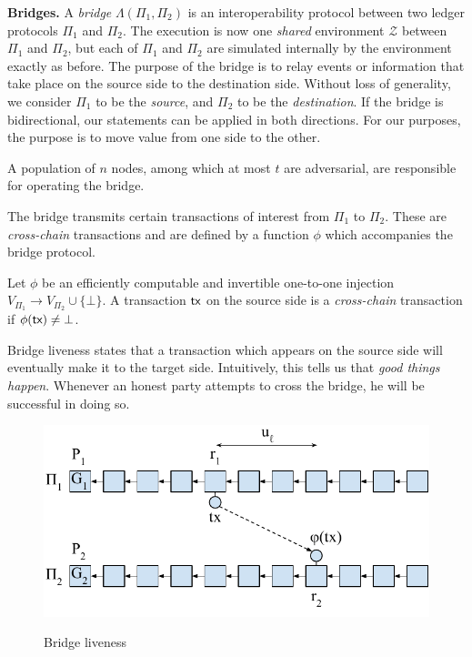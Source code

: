 \noindent
\textbf{Bridges.}
A \emph{bridge} $\Lambda(\Pi_1, \Pi_2)$ is an interoperability protocol between two ledger protocols
$\Pi_1$ and $\Pi_2$. The execution is now one \emph{shared} environment $\mathcal{Z}$ between $\Pi_1$
and $\Pi_2$, but each of $\Pi_1$ and $\Pi_2$ are simulated internally by the environment exactly as before.
The purpose of the bridge is to relay events or information that take place on the source
side to the destination side. Without loss of generality, we consider $\Pi_1$ to be the \emph{source},
and $\Pi_2$ to be the \emph{destination}. If the bridge is bidirectional, our statements can be
applied in both directions. For our purposes, the purpose is to move value from one side to
the other.

A population of $n$ nodes, among which at most $t$ are adversarial, are responsible for operating the
bridge.

The bridge transmits certain transactions of interest from $\Pi_1$ to $\Pi_2$. These are \emph{cross-chain}
transactions and are defined by a function $\phi$ which accompanies the bridge protocol.

\begin{definition}
  Let $\phi$ be an efficiently computable and invertible one-to-one
  injection $V_{\Pi_1} \longrightarrow V_{\Pi_2} \cup \{ \bot \}$.
  A transaction $\textsf{tx}$ on the source side is a \emph{cross-chain} transaction if
  $\phi(\textsf{tx}) \neq \bot$.
\end{definition}

Bridge liveness states that a transaction which appears on the source side will eventually make
it to the target side. Intuitively, this tells us that \emph{good things happen}. Whenever an
honest party attempts to cross the bridge, he will be successful in doing so.

\begin{figure}
    \center
    \includegraphics[width=0.7\columnwidth]{figures/bridge-liveness.pdf}
    \label{fig:bridge-liveness}
    \caption{Bridge liveness}
\end{figure}

